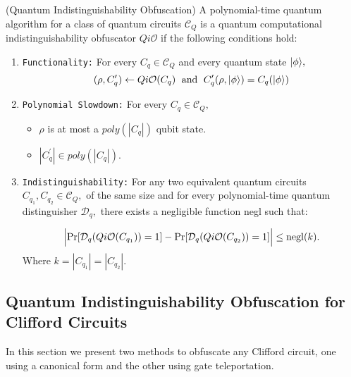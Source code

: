 \begin{definition}\label{def:} {\rm (Quantum Indistinguishability Obfuscation)}
A  polynomial-time quantum algorithm for a class of quantum circuits $\mathcal{C}_Q$ is a quantum computational indistinguishability obfuscator $Qi\mathcal{O}$  if the following conditions hold:

\begin{enumerate}
\item {\tt Functionality:}  For every $C_q\in \mathcal{C}_Q$ and every quantum state ${\lvert}\phi\rangle,$
$$(\rho, C_q^\prime)\leftarrow Qi\mathcal{O}(C_q) \;  \mbox{ and }\; C_q^\prime(\rho,{\lvert}\phi\rangle)=C_{q}({\lvert}\phi\rangle)$$
											

\item  {\tt Polynomial Slowdown:}  For every $C_{q}\in \mathcal{C}_Q,$
\begin{itemize}
\item  $\rho$ is at most a $poly(|C_{q}|)$ qubit state. 
\item $|C_{q}^\prime| \in poly(|C_{q}|).$
\end{itemize}

\item {\tt Indistinguishability:} For any two equivalent quantum circuits $C_{q_1},C_{q_2}\in \mathcal{C}_Q,$ of the same size
 and for every polynomial-time quantum distinguisher $\mathcal{D}_q,$ there exists a negligible function {\rm negl} such that:

	
					$$\Big |{\rm Pr}[\mathcal{D}_q(Qi\mathcal{O}(C_{q_1}))=1]-{\rm Pr}[\mathcal{D}_q(Qi\mathcal{O}(C_{q_2}))=1] \Big |\leq  {\rm negl}(k).$$		
Where $k=|C_{q_1}|=|C_{q_2}|.$						
\end{enumerate}
\end{definition}


\subsection{Quantum Indistinguishability Obfuscation for Clifford Circuits}
\label{QiO:Clifford-Circuits}
 In this section we present two methods to obfuscate any Clifford circuit,  one using a canonical form and the other using gate teleportation.

